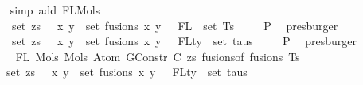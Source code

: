 \begin{isabellebody}
\ \ \ \ \isamarkupfalse%
\ {\isacharparenleft}{\kern0pt}simp\ add{\isacharcolon}{\kern0pt}\ FL{\isacharunderscore}{\kern0pt}Mols{}{\isacharparenright}{\kern0pt}\isanewline
\ \ \isamarkupfalse%
\ \isamarkupfalse%
\isanewline
\ \ \ \ {\isachardoublequoteopen}{\isachardot}{\kern0pt}{\isachardot}{\kern0pt}{\isachardot}{\kern0pt}\ {\isacharequal}{\kern0pt}\ {\isacharparenleft}{\kern0pt}set\ zs\ {\isasymunion}\ {\isacharparenleft}{\kern0pt}{\isasymUnion}\ {\isacharparenleft}{\kern0pt}x{\isacharcomma}{\kern0pt}\ y{\isacharparenright}{\kern0pt}\ {\isasymin}\ set\ fusions{\isachardot}{\kern0pt}\ {\isacharbraceleft}{\kern0pt}x{\isacharcomma}{\kern0pt}\ y{\isacharbraceright}{\kern0pt}{\isacharparenright}{\kern0pt}{\isacharparenright}{\kern0pt}\ {\isasymunion}\ {\isasymUnion}\ {\isacharparenleft}{\kern0pt}FL\ {\isacharbackquote}{\kern0pt}\ set\ Ts{\isacharparenright}{\kern0pt}{\isachardoublequoteclose}\isanewline
\ \ \ \isamarkupfalse%
\ P{}{}\ \isamarkupfalse%
\ presburger\isanewline
\ \ \isamarkupfalse%
\ \isamarkupfalse%
\isanewline
\ \ \ \ {\isachardoublequoteopen}{\isachardot}{\kern0pt}{\isachardot}{\kern0pt}{\isachardot}{\kern0pt}\ {\isacharequal}{\kern0pt}\ set\ zs\ {\isasymunion}\ {\isacharparenleft}{\kern0pt}{\isasymUnion}\ {\isacharparenleft}{\kern0pt}x{\isacharcomma}{\kern0pt}\ y{\isacharparenright}{\kern0pt}\ {\isasymin}\ set\ fusions{\isachardot}{\kern0pt}\ {\isacharbraceleft}{\kern0pt}x{\isacharcomma}{\kern0pt}\ y{\isacharbraceright}{\kern0pt}{\isacharparenright}{\kern0pt}\ {\isasymunion}\ {\isasymUnion}\ {\isacharparenleft}{\kern0pt}FLty\ {\isacharbackquote}{\kern0pt}\ set\ taus{\isacharparenright}{\kern0pt}{\isachardoublequoteclose}\isanewline
\ \ \ \isamarkupfalse%
\ P{}\ \isamarkupfalse%
\ presburger\isanewline
\ \ \isamarkupfalse%
\ \isamarkupfalse%
\isanewline
\ \ \ \ \ {\isachardoublequoteopen}FL\ {\isacharparenleft}{\kern0pt}Mols{}\ {\isacharparenleft}{\kern0pt}Mols{}\ {\isacharparenleft}{\kern0pt}Atom\ {\isacharparenleft}{\kern0pt}GConstr\ C{\isacharparenright}{\kern0pt}\ zs{\isacharparenright}{\kern0pt}\ {\isacharparenleft}{\kern0pt}fusions{\isacharunderscore}{\kern0pt}of\ fusions{\isacharparenright}{\kern0pt}{\isacharparenright}{\kern0pt}\ Ts{\isacharparenright}{\kern0pt}\ {\isacharequal}{\kern0pt}\isanewline
\ \ \ \ \ set\ zs\ {\isasymunion}\ {\isacharparenleft}{\kern0pt}{\isasymUnion}\ {\isacharparenleft}{\kern0pt}x{\isacharcomma}{\kern0pt}\ y{\isacharparenright}{\kern0pt}\ {\isasymin}\ set\ fusions{\isachardot}{\kern0pt}\ {\isacharbraceleft}{\kern0pt}x{\isacharcomma}{\kern0pt}\ y{\isacharbraceright}{\kern0pt}{\isacharparenright}{\kern0pt}\ {\isasymunion}\ {\isasymUnion}\ {\isacharparenleft}{\kern0pt}FLty\ {\isacharbackquote}{\kern0pt}\ set\ taus{\isacharparenright}{\kern0pt}{\isachardoublequoteclose}\isanewline

\end{isabellebody}
